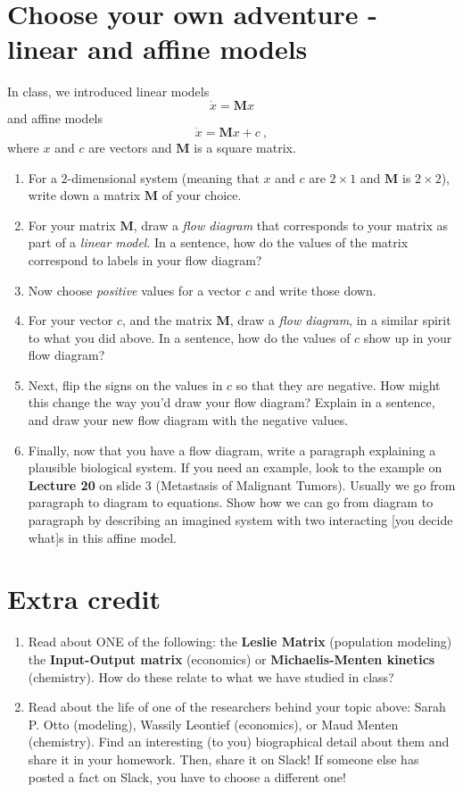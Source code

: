 \documentclass[11pt,onecolumn,superscriptaddress,notitlepage]{article}
\begin{document}
\clearpage
\section*{Choose your own adventure - linear and affine models} 
In class, we introduced linear models $$\dot{x} = \mathbf{M}x$$ and affine models $$\dot{x} = \mathbf{M}x + c\ ,$$ where $x$ and $c$ are vectors and $\mathbf{M}$ is a square matrix. 
\begin{enumerate}[resume]
	\item For a $2$-dimensional system (meaning that $x$ and $c$ are $2 \times 1$ and $\mathbf{M}$ is $2 \times 2$), write down a matrix $\mathbf{M}$ of your choice.
	\item For your matrix $\mathbf{M}$, draw a {\it flow diagram} that corresponds to your matrix as part of a {\it linear model}. In a sentence, how do the values of the matrix correspond to labels in your flow diagram?
	\item Now choose {\it positive} values for a vector $c$ and write those down.
	\item For your vector $c$, and the matrix $\mathbf{M}$, draw a {\it flow diagram}, in a similar spirit to what you did above. In a sentence, how do the values of $c$ show up in your flow diagram?
	\item Next, flip the signs on the values in $c$ so that they are negative. How might this change the way you'd draw your flow diagram? Explain in a sentence, and draw your new flow diagram with the negative values. 
	\item Finally, now that you have a flow diagram, write a paragraph explaining a plausible biological system. If you need an example, look to the example on {\bf Lecture 20} on slide 3 (Metastasis of Malignant Tumors). Usually we go from paragraph to diagram to equations. Show how we can go from diagram to paragraph by describing an imagined system with two interacting [you decide what]s in this affine model.
\end{enumerate}

\section*{Extra credit}
\begin{enumerate}[resume]
	\item Read about ONE of the following: the {\bf Leslie Matrix} (population modeling) the {\bf Input-Output matrix} (economics) or {\bf Michaelis-Menten kinetics} (chemistry). How do these relate to what we have studied in class? 
	\item Read about the life of one of the researchers behind your topic above: Sarah P. Otto (modeling), Wassily Leontief (economics), or Maud Menten (chemistry). Find an interesting (to you) biographical detail about them and share it in your homework. Then, share it on Slack! If someone else has posted a fact on Slack, you have to choose a different one!
\end{enumerate}

\end{document}
